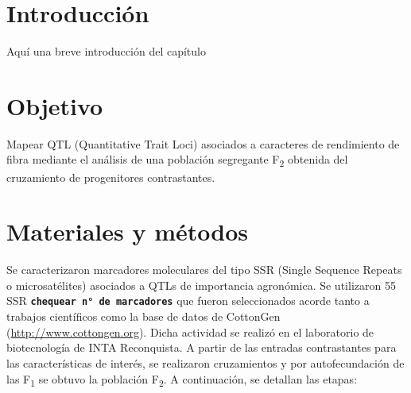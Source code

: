 \documentclass[12pt,oneside]{reedthesis}
\begin{document}
\section{Introducción}\label{introducciuxf3n-3}

Aquí una breve introducción del capítulo

\section{Objetivo}\label{objetivo-2}

Mapear QTL (Quantitative Trait Loci) asociados a caracteres de rendimiento de fibra mediante el análisis de una población segregante F\textsubscript{2} obtenida del cruzamiento de progenitores contrastantes.

\section{Materiales y métodos}\label{materiales-y-muxe9todos-2}

Se caracterizaron marcadores moleculares del tipo SSR (Single Sequence Repeats o microsatélites) asociados a QTLs de importancia agronómica. Se utilizaron 55 SSR \textbf{\texttt{chequear\ n°\ de\ marcadores}} que fueron seleccionados acorde tanto a trabajos científicos \autocite{zhang2005,shen2007,wang2007,wang2014,xia2014,wang2015,an2010,liu2012,qin2015,shi2015,su2016,zhang2016,ademe2017,liu2017,iqbal2017,li2017,baytar2018,liu2018} como la base de datos de CottonGen (\url{http://www.cottongen.org}). Dicha actividad se realizó en el laboratorio de biotecnología de INTA Reconquista. A partir de las entradas contrastantes para las características de interés, se realizaron cruzamientos y por autofecundación de las F\textsubscript{1} se obtuvo la población F\textsubscript{2}. A continuación, se detallan las etapas:
\end{document}
